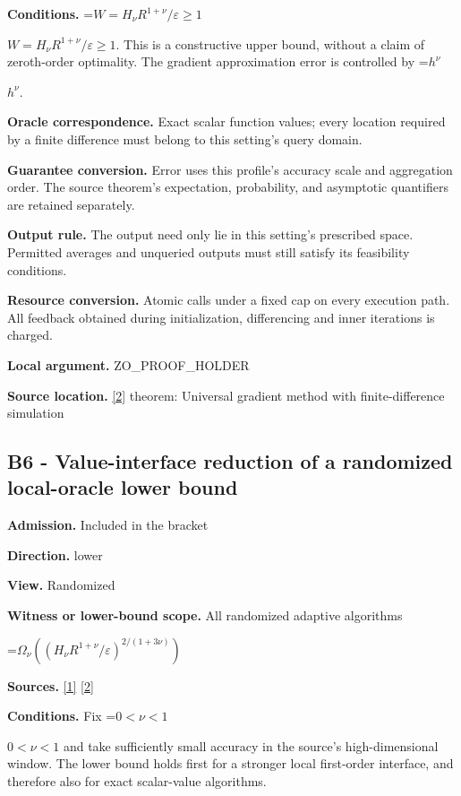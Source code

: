 \documentclass[10pt,a4paper]{article}
\newcommand{\AtlasMath}[1]{\par\begingroup\centering\setbox0=\hbox{$\displaystyle #1$}\ifdim\wd0>1.4\linewidth\typeout{ATLAS WIDE FORMULA: \the\wd0}\fi\ifdim\wd0>\linewidth\resizebox{\linewidth}{!}{\box0}\else\box0\fi\par\endgroup}
\newcommand{\AtlasInlineMath}[1]{\begingroup\setbox0=\hbox{$#1$}\ifdim\wd0>.4\linewidth\endgroup\AtlasMath{#1}\else\endgroup$#1$\fi}
\begin{document}
\textbf{Conditions.} \AtlasInlineMath{W=H_\nu R^{1+\nu}/\varepsilon\ge1}. This is a constructive upper bound, without a claim of zeroth-order optimality. The gradient approximation error is controlled by \AtlasInlineMath{h^\nu}.

\textbf{Oracle correspondence.} Exact scalar function values; every location required by a finite difference must belong to this setting's query domain.

\textbf{Guarantee conversion.} Error uses this profile's accuracy scale and aggregation order. The source theorem's expectation, probability, and asymptotic quantifiers are retained separately.

\textbf{Output rule.} The output need only lie in this setting's prescribed space. Permitted averages and unqueried outputs must still satisfy its feasibility conditions.

\textbf{Resource conversion.} Atomic calls under a fixed cap on every execution path. All feedback obtained during initialization, differencing and inner iterations is charged.

\textbf{Local argument.} ZO\_\allowbreak{}PROOF\_\allowbreak{}HOLDER

\textbf{Source location.} \href{https://optimization-online.org/wp-content/uploads/2013/04/3833.pdf}{[2]} theorem: Universal gradient method with finite-difference simulation

\subsection{B6 - Value-interface reduction of a randomized local-oracle lower bound}
\textbf{Admission.} Included in the bracket

\textbf{Direction.} lower

\textbf{View.} Randomized

\textbf{Witness or lower-bound scope.} All randomized adaptive algorithms

\AtlasMath{\Omega_\nu((H_\nu R^{1+\nu}/\varepsilon)^{2/(1+3\nu)})}
\textbf{Sources.} \href{https://proceedings.mlr.press/v99/diakonikolas19c/diakonikolas19c.pdf}{[1]} \href{https://optimization-online.org/wp-content/uploads/2013/04/3833.pdf}{[2]}

\textbf{Conditions.} Fix \AtlasInlineMath{0<\nu<1} and take sufficiently small accuracy in the source's high-dimensional window. The lower bound holds first for a stronger local first-order interface, and therefore also for exact scalar-value algorithms.
\end{document}
